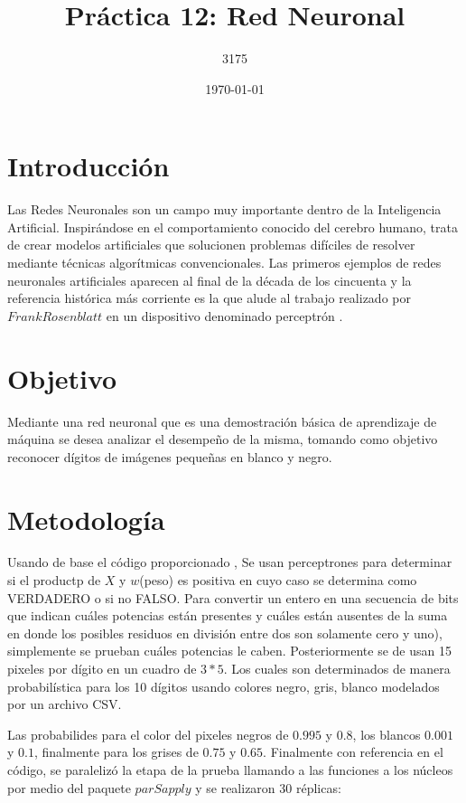 \documentclass{article}
\author{3175}
\title{Práctica 12: Red Neuronal}
\date{\today}
\begin{document}
\maketitle


\section{Introducción}
Las Redes Neuronales son un campo muy importante dentro de la Inteligencia Artificial. Inspirándose en el comportamiento conocido del cerebro humano, trata de crear modelos artificiales que solucionen problemas difíciles de resolver mediante técnicas algorítmicas convencionales.
Las primeros ejemplos de redes neuronales artificiales aparecen al final de la década de los cincuenta y la referencia histórica más corriente es la que alude al trabajo realizado por $Frank Rosenblatt$ en un dispositivo denominado perceptrón \citep{web1}.
 
\section{Objetivo}
Mediante una red neuronal que es una demostración básica de aprendizaje de máquina se desea analizar el desempeño de la misma, tomando como objetivo reconocer dígitos de imágenes pequeñas en blanco y negro.
 
\section{Metodología}
Usando de base el código proporcionado \citep{webelisa}, Se usan perceptrones para determinar si el productp de $X$ y $w$(peso) es positiva en cuyo caso se determina como VERDADERO o si no FALSO. Para convertir un entero en una secuencia de bits que indican
cuáles potencias están presentes y cuáles están ausentes de la suma en donde los posibles residuos en división entre dos son solamente cero y uno), simplemente se prueban cuáles potencias le caben. 
Posteriormente se de usan 15 pixeles por dígito en un cuadro de $3*5$. Los cuales son determinados de manera probabilística para los 10 dígitos usando colores negro, gris, blanco modelados por un archivo CSV. 


Las probabilides para el color del pixeles negros de $0.995$ y $0.8$, los blancos $0.001$ y $0.1$, finalmente para los grises de $0.75$ y $0.65$.
Finalmente con referencia en el código\citep{web2}, se paralelizó la etapa de la prueba llamando a las funciones a los núcleos por medio del paquete $parSapply$ y se realizaron 30 réplicas:
\end{document}
